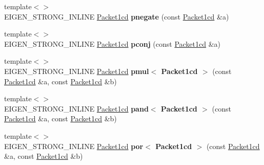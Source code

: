 \begin{DoxyCompactItemize}
\item 
\mbox{\label{namespace_eigen_1_1internal_ae869e23cf8e6df4b433699ebd265d31e}} 
{\footnotesize template$<$$>$ }\\E\+I\+G\+E\+N\+\_\+\+S\+T\+R\+O\+N\+G\+\_\+\+I\+N\+L\+I\+NE \hyperlink{struct_eigen_1_1internal_1_1_packet1cd}{Packet1cd} {\bfseries pnegate} (const \hyperlink{struct_eigen_1_1internal_1_1_packet1cd}{Packet1cd} \&a)
\item 
\mbox{\label{namespace_eigen_1_1internal_a35099da9d1888b83cd39b5e550df71d4}} 
{\footnotesize template$<$$>$ }\\E\+I\+G\+E\+N\+\_\+\+S\+T\+R\+O\+N\+G\+\_\+\+I\+N\+L\+I\+NE \hyperlink{struct_eigen_1_1internal_1_1_packet1cd}{Packet1cd} {\bfseries pconj} (const \hyperlink{struct_eigen_1_1internal_1_1_packet1cd}{Packet1cd} \&a)
\item 
\mbox{\label{namespace_eigen_1_1internal_a5eea28d03ca7dc618533d3b18db113a4}} 
{\footnotesize template$<$$>$ }\\E\+I\+G\+E\+N\+\_\+\+S\+T\+R\+O\+N\+G\+\_\+\+I\+N\+L\+I\+NE \hyperlink{struct_eigen_1_1internal_1_1_packet1cd}{Packet1cd} {\bfseries pmul$<$ Packet1cd $>$} (const \hyperlink{struct_eigen_1_1internal_1_1_packet1cd}{Packet1cd} \&a, const \hyperlink{struct_eigen_1_1internal_1_1_packet1cd}{Packet1cd} \&b)
\item 
\mbox{\label{namespace_eigen_1_1internal_ab3b46233de25d02d88a67b047e97f01c}} 
{\footnotesize template$<$$>$ }\\E\+I\+G\+E\+N\+\_\+\+S\+T\+R\+O\+N\+G\+\_\+\+I\+N\+L\+I\+NE \hyperlink{struct_eigen_1_1internal_1_1_packet1cd}{Packet1cd} {\bfseries pand$<$ Packet1cd $>$} (const \hyperlink{struct_eigen_1_1internal_1_1_packet1cd}{Packet1cd} \&a, const \hyperlink{struct_eigen_1_1internal_1_1_packet1cd}{Packet1cd} \&b)
\item 
\mbox{\label{namespace_eigen_1_1internal_ae1ae10fd3366e66f7a9a4a08142cb088}} 
{\footnotesize template$<$$>$ }\\E\+I\+G\+E\+N\+\_\+\+S\+T\+R\+O\+N\+G\+\_\+\+I\+N\+L\+I\+NE \hyperlink{struct_eigen_1_1internal_1_1_packet1cd}{Packet1cd} {\bfseries por$<$ Packet1cd $>$} (const \hyperlink{struct_eigen_1_1internal_1_1_packet1cd}{Packet1cd} \&a, const \hyperlink{struct_eigen_1_1internal_1_1_packet1cd}{Packet1cd} \&b)

\end{DoxyCompactItemize}
